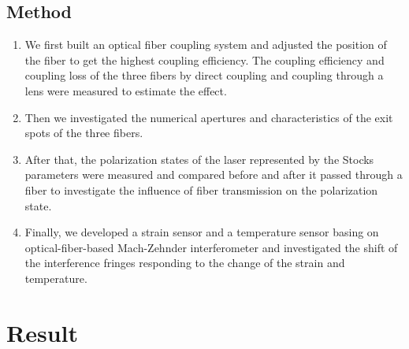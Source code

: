 \documentclass[10pt,a4paper,twocolumn,twoside,UTF8]{article}
\begin{document}
	\subsection{Method}
		\begin{enumerate}[label=\arabic*.]
			\item We first built an optical fiber coupling system and adjusted the position of the fiber to get the highest coupling efficiency. The coupling efficiency and coupling loss of the three fibers by direct coupling and coupling through a lens were measured to estimate the effect.
			\item Then we investigated the numerical apertures and characteristics of the exit spots of the three fibers.
			\item After that, the polarization states of the laser represented by the Stocks parameters were measured and compared before and after it passed through a fiber to investigate the influence of fiber transmission on the polarization state.
			\item Finally, we developed a strain sensor and a temperature sensor basing on optical-fiber-based Mach-Zehnder interferometer and investigated the shift of the interference fringes responding to the change of the strain and temperature.
		\end{enumerate}

\section{Result}
\end{document}
